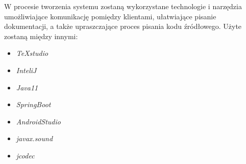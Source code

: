W procesie tworzenia systemu zostaną wykorzystane technologie i narzędzia umożliwiające komunikację pomiędzy klientami, ułatwiające pisanie dokumentacji, a także upraszczające proces pisania kodu źródłowego. Użyte zostaną między innymi:
\begin{itemize}
	\item \textit{TeXstudio}
	\item \textit{InteliJ}
	\item \textit{Java11}
	\item \textit{SpringBoot}
	\item \textit{AndroidStudio}
	\item \textit{javax.sound}
	\item \textit{jcodec}
\end{itemize}
